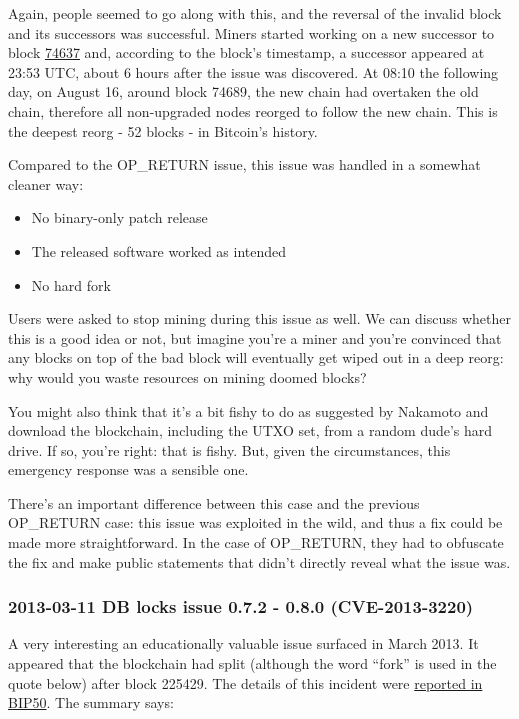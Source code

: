 Again, people seemed to go along with this, and the reversal of the
invalid block and its successors was successful. Miners started working
on a new successor to block
\href{https://mempool.space/block/0000000000606865e679308edf079991764d88e8122ca9250aef5386962b6e84}{74637}
and, according to the block's timestamp, a successor appeared at 23:53
UTC, about 6 hours after the issue was discovered. At 08:10 the
following day, on August 16, around block 74689, the new chain had
overtaken the old chain, therefore all non-upgraded nodes reorged to
follow the new chain. This is the deepest reorg - 52 blocks - in
Bitcoin's history.

Compared to the OP\_RETURN issue, this issue was handled in a somewhat
cleaner way:

\begin{itemize}
\item
  No binary-only patch release
\item
  The released software worked as intended
\item
  No hard fork
\end{itemize}

Users were asked to stop mining during this issue as well. We can
discuss whether this is a good idea or not, but imagine you're a miner
and you're convinced that any blocks on top of the bad block will
eventually get wiped out in a deep reorg: why would you waste resources
on mining doomed blocks?

You might also think that it's a bit fishy to do as suggested by
Nakamoto and download the blockchain, including the UTXO set, from a
random dude's hard drive. If so, you're right: that is fishy. But, given
the circumstances, this emergency response was a sensible one.

There's an important difference between this case and the previous
OP\_RETURN case: this issue was exploited in the wild, and thus a fix
could be made more straightforward. In the case of OP\_RETURN, they had
to obfuscate the fix and make public statements that didn't directly
reveal what the issue was.

\hypertarget{march2013split}{%
\subsubsection{2013-03-11 DB locks issue 0.7.2 - 0.8.0
(CVE-2013-3220)}\label{march2013split}}

A very interesting an educationally valuable issue surfaced in March
2013. It appeared that the blockchain had split (although the word
``fork'' is used in the quote below) after block 225429. The details of
this incident were
\href{https://github.com/bitcoin/bips/blob/master/bip-0050.mediawiki}{reported
in BIP50}. The summary says:

